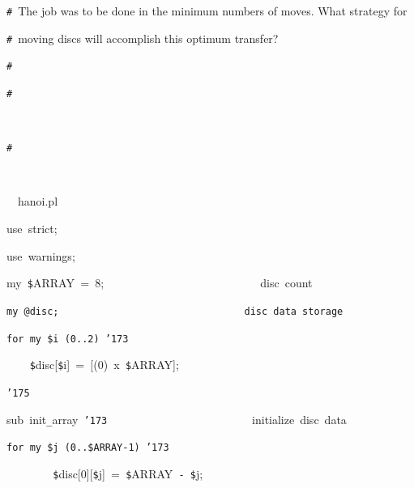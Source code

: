 \documentclass{article}
\begin{document}
\noindent
\mbox{}{\tt\#}\  {}\hspace{\leftmargini}The job was to be done in the minimum numbers of moves. What strategy for  \rm\mc 

\noindent
\mbox{}{\tt\#}\  {}\hspace{\leftmargini}moving discs will accomplish this optimum transfer?  \rm\mc 

\noindent
\mbox{}{\tt\#}\  {}  \rm\mc 

\noindent
\mbox{}{\tt\#}
\tt\mc 

\noindent
\mbox{}\rm\mc {\tt\#}\  {}%

\noindent
\mbox{}{\tt\#}
\tt\mc 

\noindent
\mbox{}\rm\mc {\tt\#}\  \hrulefill  \rm\mc 

\noindent
\mbox{}\tt\mc \hfill

\noindent
\mbox{}\rm\mc {\tt\#}\  \hrulefill\ hanoi.pl \ \hrulefill \rm\mc 

\noindent
\mbox{}\tt\mc \hfill

\noindent
\mbox{}use{\tt\mc \ }strict;

\noindent
\mbox{}use{\tt\mc \ }warnings;

\noindent
\mbox{}\hfill

\noindent
\mbox{}my{\tt\mc \ }{\tt\$}ARRAY{\tt\mc \ }={\tt\mc \ }8;{\tt\mc \ \ \ \ \ \ \ \ \ \ \ \ \ \ \ \ \ \ \ \ \ \ \ \ \ \ }\rm\mc {\tt\#}\ disc\ count

\noindent
\mbox{}\tt\mc my{\tt\mc \ }@disc;{\tt\mc \ \ \ \ \ \ \ \ \ \ \ \ \ \ \ \ \ \ \ \ \ \ \ \ \ \ \ \ \ \ \ }\rm\mc {\tt\#}\ disc\ data\ storage

\noindent
\mbox{}\tt\mc for{\tt\mc \ }my{\tt\mc \ }{\tt\$}i{\tt\mc \ }(0..2){\tt\mc \ }{\tt\char'173}

\noindent
\mbox{}{\tt\mc \ \ \ \ }{\tt\$}disc[{\tt\$}i]{\tt\mc \ }={\tt\mc \ }[(0){\tt\mc \ }x{\tt\mc \ }{\tt\$}ARRAY];

\noindent
\mbox{}{\tt\char'175}

\noindent
\mbox{}\hfill

\noindent
\mbox{}sub{\tt\mc \ }init{\tt\_}array{\tt\mc \ }{\tt\char'173}{\tt\mc \ \ \ \ \ \ \ \ \ \ \ \ \ \ \ \ \ \ \ \ \ \ \ \ }\rm\mc {\tt\#}\ initialize\ disc\ data

\noindent
\mbox{}\tt\mc {\tt\mc \ \ \ \ }for{\tt\mc \ }my{\tt\mc \ }{\tt\$}j{\tt\mc \ }(0..{\tt\$}ARRAY{\tt -}1){\tt\mc \ }{\tt\char'173}

\noindent
\mbox{}{\tt\mc \ \ \ \ \ \ \ \ }{\tt\$}disc[0][{\tt\$}j]{\tt\mc \ }={\tt\mc \ }{\tt\$}ARRAY{\tt\mc \ }{\tt -}{\tt\mc \ }{\tt\$}j;
\end{document}
